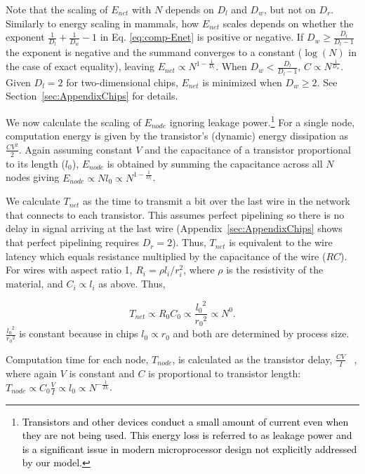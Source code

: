 \documentclass[12pt]{article}
\newcommand{\red}[1]{\textcolor{black}{#1}}
\begin{document}
\noindent Note that the scaling of $E_{net} $ with $N$ depends on $D_l$ and
$D_w$, but not on $D_r$. Similarly to energy scaling in
mammals, how $E_{net}$ scales depends on whether the exponent
$\frac{1}{D_l} + \frac{1}{D_w}-1$ in Eq. \ref {eq:comp-Enet} is positive or
negative.  If $D_w \geq \frac{D_l}{D_l -1}$ the exponent is negative and the
summand converges to a constant ($\log(N)$ in the case of exact equality),
leaving $E_{net} \propto N^{1-\frac{1}{D_l}}$. When $D_w < \frac{D_l}{D_l -1}$,
$C \propto N^{\frac{1}{D_w}}$. Given $D_l = 2$ for two-dimensional chips, $E_{net}$
is minimized when $D_w \geq 2$. See Section~\ref{sec:AppendixChips} for
details.

We now calculate the scaling of $E_{node}$ ignoring leakage
power.\footnote{\red{Transistors and other devices conduct a small amount
  of current even when they are not being used. This energy loss is referred
  to as leakage power and is a significant issue in modern
  microprocessor design not explicitly addressed by our model.}}
For a single node, computation
energy is given by the transistor's (dynamic) energy dissipation as
$\frac{CV^2}{2}$. Again assuming constant $V$ and the capacitance of a
transistor proportional to its length ($l_0$), $E_{node}$ is obtained
by summing
the capacitance across all $N$ nodes giving $E_{node} \propto N l_0  \propto
N^{1-\frac{1}{D_l}}$. 

We calculate $T_{net}$ as the time to transmit a bit over the last 
wire
in the network that connects to each transistor. This assumes perfect
pipelining so there is no delay in signal arriving at the last wire
(Appendix~\ref{sec:AppendixChips} shows that perfect pipelining requires $D_r =
2$). Thus, $T_{net}$ is equivalent to the wire latency which equals resistance
multiplied by the capacitance of the wire ($RC$). For wires with aspect ratio
1, $R_i = \rho l_i /r_i^2$, where $\rho$ is the resistivity of the material,
and $C_i \propto l_i$ as above.  Thus, 

\begin{equation}
\label{eq:comp-Tnet}
T_{net} \propto R_0C_0 \propto
\frac{{l_0}^2}{{r_0}^2} \propto N^0 .
\end {equation}
\noindent $ \frac{{l_0}^2}{{r_0}^2}$ is constant
because in chips  $l_0 \propto r_0$ and both are determined by process size.

Computation time for each node, $T_{node}$, is calculated as the transistor
delay, $\frac{CV}{I}$ ~\cite{bakoglu90}, where again $V$ is constant and $C$ is
proportional to transistor length: $T_{node} \propto C_0 \frac{V}{I}  \propto
l_0  \propto N^{-\frac{1}{D_l}}$. 
\end{document}
